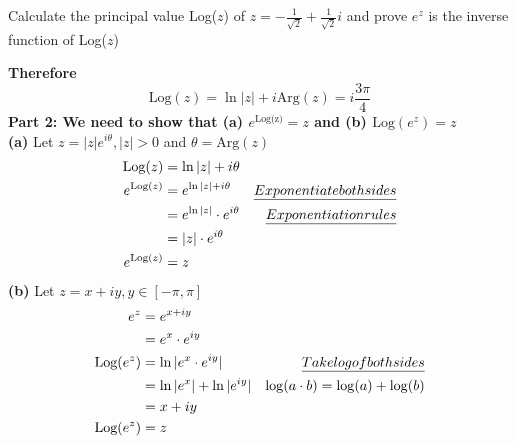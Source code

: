 \documentclass[a4paper, 8pt]{extarticle}
\begin{document}
\begin{examplebox}{Calculate the principal value Log($z$) of $z = -\frac{1}{\sqrt{2}} + \frac{1}{\sqrt{2}}i$ and prove $e^z$ is the inverse function of Log($z$)}{}
\begin{minipage}{0.5\textwidth}
\begin{center}
		\end{center}
	\end{minipage}
	\textbf{Therefore}
	$$
		\text{Log}(z) = \ln|z| + i\text{Arg}(z) = i\frac{3\pi}{4}
	$$
	\textbf{Part 2: We need to show that (a) $e^{\text{Log(z)}} = z$ and (b) $\text{Log}(e^z) = z$} \\
	\textbf{(a)} Let $z = |z| e^{i \theta}, |z| > 0$ and $\theta = \text{Arg}(z)$
	\begin{align*}
		\text{Log}(z)     & = \ln|z| + i \theta                                             \\
		e^{\text{Log}(z)} & = e^{\ln|z| + i\theta}         & \emph{Exponentiate both sides} \\
		                  & = e^{\ln|z|} \cdot e^{i\theta} & \emph{Exponentiation rules}    \\
		                  & = |z| \cdot e^{i\theta}                                         \\
		e^{\text{Log}(z)} & = z
	\end{align*}
	\textbf{(b)} Let $z = x+iy, y \in [-\pi, \pi]$
	\begin{align*}
		e^z             & = e^{x+iy}                                                     \\
		                & = e^x \cdot e^{iy}                                             \\
		\text{Log}(e^z) & = \ln|e^x \cdot e^{iy}|  & \emph{Take log of both sides}       \\
		                & = \ln|e^x| + \ln|e^{iy}| & \log(a \cdot b) = \log(a) + \log(b) \\
		                & = x + iy                                                       \\
		\text{Log}(e^z) & = z
	\end{align*}
\end{examplebox}
\end{document}
